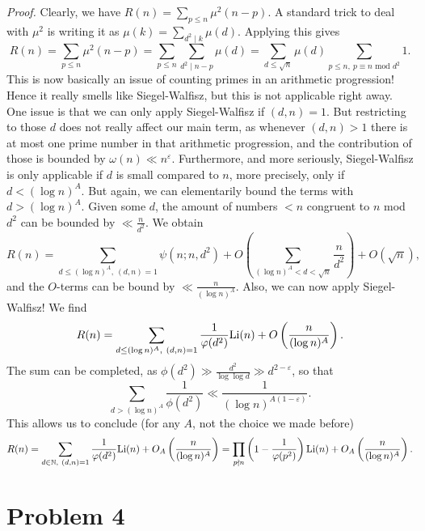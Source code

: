 \documentclass[a4paper,11pt]{article}
\begin{document}
\textit{Proof.} Clearly, we have $R(n) = \sum_{p \leq n} \mu^2(n-p)$. A standard 
trick to deal with $\mu^2$ is writing it as $\mu(k) = \sum_{d^2 \mid k} \mu(d)$.
Applying this gives
\[
    R(n) = \sum_{p \leq n} \mu^2(n-p) = \sum_{p \leq n} \sum_{d^2 \mid n-p} \mu(d)
    = \sum_{d \leq \sqrt n} \mu(d) \sum_{p \leq n, \ p \equiv n \text{ mod } d^2} 1.
\]
This is now basically an issue of counting primes in an arithmetic progression! 
Hence it really smells like Siegel-Walfisz, but this is not applicable right away. 
One issue is that we can only apply Siegel-Walfisz if $(d,n)=1$. But restricting to those
$d$ does not really affect our main term, as whenever $(d,n)>1$ there is at
most one prime number in that arithmetic progression, and the contribution of
those is bounded by $\omega(n) \ll n^{\varepsilon}$. Furthermore, and more
seriously, Siegel-Walfisz is only applicable if $d$ is small compared to $n$,
more precisely, only if $d < (\log n)^A$.  But again, we can elementarily bound
the terms with $d > (\log n)^A$. Given some $d$, the amount of numbers $<n$
congruent to $n$ mod $d^2$ can be bounded by $\ll \frac n {d^2}$. We obtain
\[
    R(n) = \sum_{d \leq (\log n)^A, \ (d,n)=1} \psi(n; n, d^2) + 
    O\left(\sum_{(\log n)^A < d < \sqrt n} \frac{n}{d^2} \right) + O(\sqrt n),
\]
and the $O$-terms can be bound by $\ll \frac{n}{(\log n)^A}$. Also, we can now apply
Siegel-Walfisz! We find
\[
    R(n) = \sum_{d \leq (\log n)^A, \ (d,n)=1} \frac{1}{\varphi(d^2)} \mathrm{Li}(n) 
    + O\left( \frac{n}{(\log n)^A} \right).
\]
The sum can be completed, as $\phi(d^2) \gg \frac {d^2}{\log \log d} \gg
d^{2-\varepsilon}$, so that 
\[
    \sum_{d > (\log n)^A} \frac 1{\phi(d^2)} \ll \frac{1}{(\log n)^{A(1-\varepsilon)}}.
\]
This allows us to conclude (for any $A$, not the choice we made before)
\[
    R(n) = \sum_{d \in \mathbb{N}, \ (d,n) = 1} \frac 1 {\varphi(d^2)} \mathrm{Li}(n)
    + O_A\left( \frac{n}{(\log n)^A} \right) = \prod_{p \nmid n}\left(1-\frac
    1{\varphi(p^2)}\right) \mathrm{Li}(n) + O_A\left( \frac{n}{(\log n)^A} \right).
\]




\section*{Problem 4}
\contactend
\end{document}
